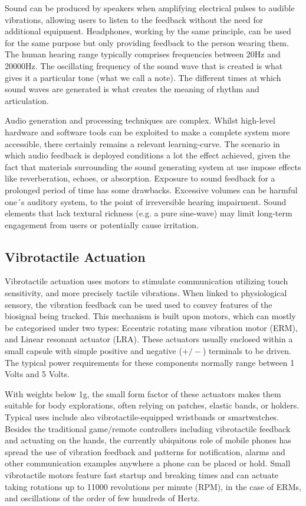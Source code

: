 Sound can be produced by speakers when amplifying electrical pulses to audible vibrations, allowing users to listen to the feedback without the need for additional equipment. Headphones, working by the same principle, can be used for the same purpose but only providing feedback to the person wearing them. The human hearing range typically comprises frequencies between 20Hz and 20000Hz. The oscillating frequency of the sound wave that is created is what gives it a particular tone (what we call a note). The different times at which sound waves are generated is what creates the meaning of rhythm and articulation.

Audio generation and processing techniques are complex. Whilst high-level hardware and software tools can be exploited to make a complete system more accessible, there certainly remains a relevant learning-curve. The scenario in which audio feedback is deployed conditions a lot the effect achieved, given the fact that materials surrounding the sound generating system at use impose effects like reverberation, echoes, or absorption. Exposure to sound feedback for a prolonged period of time has some drawbacks. Excessive volumes can be harmful one´s auditory system, to the point of irreversible hearing impairment. Sound elements that lack textural richness (e.g. a pure sine-wave) may limit long-term engagement from users or potentially cause irritation.

\subsection*{Vibrotactile Actuation}

Vibrotactile actuation uses motors to stimulate communication utilizing touch sensitivity, and more precisely tactile vibrations. When linked to physiological sensory, the vibration feedback can be used used to convey features of the biosignal being tracked. This mechanism is built upon motors, which can mostly be categorised under two types: Eccentric rotating mass vibration motor (ERM), and Linear resonant actuator (LRA). These actuators usually enclosed within a small capsule with simple positive and negative ($+/-$) terminals to be driven. The typical power requirements for these components normally range between 1 Volts and 5 Volts.

With weights below 1g, the small form factor of these actuators makes them suitable for body explorations, often relying on patches, elastic bands, or holders. Typical uses include also vibrotactile-equipped wristbands or smartwatches. Besides the traditional game/remote controllers including vibrotactile feedback and actuating on the hands, the currently ubiquitous role of mobile phones has spread the use of vibration feedback and patterns for notification, alarms and other communication examples anywhere a phone can be placed or hold. Small vibrotactile motors feature fast startup and breaking times and can actuate taking rotations up to 11000 revolutions per minute (RPM), in the case of ERMs, and oscillations of the order of few hundreds of Hertz.

